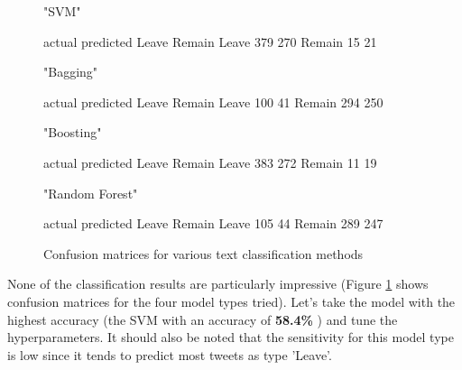 \documentclass[10pt]{article}
\begin{document}
\hspace{1cm} 

\begin{figure}[H]
\begin{center}
\begin{Schunk}

\begin{Soutput}
[1] "SVM"
\end{Soutput}
\begin{Soutput}
         actual
predicted Leave Remain
   Leave    379    270
   Remain    15     21
\end{Soutput}

\begin{Soutput}
[1] "Bagging"
\end{Soutput}
\begin{Soutput}
         actual
predicted Leave Remain
   Leave    100     41
   Remain   294    250
\end{Soutput}
\begin{Soutput}
[1] "Boosting"
\end{Soutput}
\begin{Soutput}
         actual
predicted Leave Remain
   Leave    383    272
   Remain    11     19
\end{Soutput}
\begin{Soutput}
[1] "Random Forest"
\end{Soutput}
\begin{Soutput}
         actual
predicted Leave Remain
   Leave    105     44
   Remain   289    247
\end{Soutput}
\end{Schunk}

\caption {Confusion matrices for various text classification methods}
\label{fig15}
\end {center}
\end {figure}

None of the classification results are particularly impressive (Figure \ref{fig15} shows confusion matrices for the four model types tried). Let's take the model with the highest accuracy (the SVM with an accuracy of \textbf{58.4\%} ) and tune the hyperparameters. It should also be noted that the sensitivity for this model type is low since it tends to predict most tweets as type 'Leave'.
\end{document}
